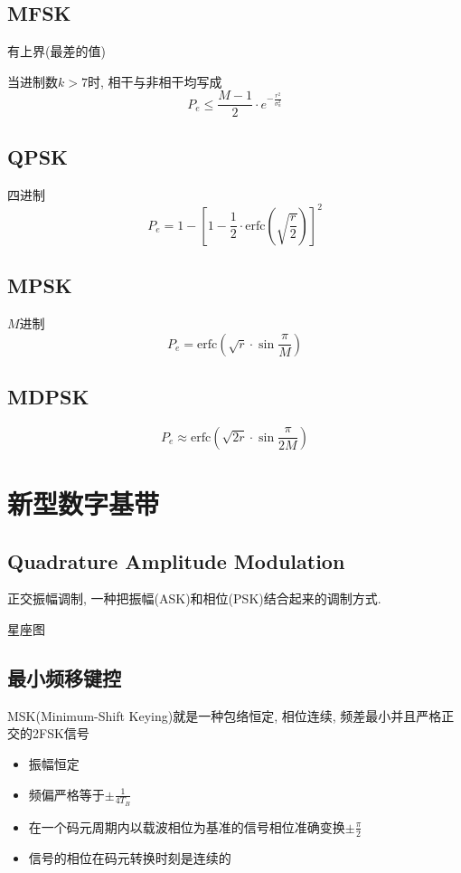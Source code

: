 \documentclass[a4paper]{report}
\begin{document}
\subsection{MFSK}
有上界(最差的值)

当进制数$k>7$时, 相干与非相干均写成
\begin{equation}
  P_e\leq \frac{M-1}{2}\cdot e^{-\frac{r^2}{\sigma_n^2}}
\end{equation}
\subsection{QPSK}
四进制
\begin{equation}
  P_e=1-[1-\frac{1}{2}\cdot \text{erfc}(\sqrt{\frac{r}{2}})]^2
\end{equation}
\subsection{MPSK}
$M$进制
\begin{equation}
  P_e=\text{erfc}(\sqrt{r}\cdot\sin{\frac{\pi}{M}})
\end{equation}
\subsection{MDPSK}
\begin{equation}
  P_e\approx \text{erfc}(\sqrt{2 r}\cdot \sin{\frac{\pi}{2M}})
\end{equation}

\section{新型数字基带}
\subsection{Quadrature Amplitude Modulation}
正交振幅调制, 一种把振幅(ASK)和相位(PSK)结合起来的调制方式. 

星座图
\subsection{最小频移键控}
MSK(Minimum-Shift Keying)就是一种包络恒定, 相位连续, 频差最小并且严格正交的2FSK信号
\begin{itemize}
  \item 振幅恒定
  \item 频偏严格等于$\pm\frac{1}{4T_B}$
  \item 在一个码元周期内以载波相位为基准的信号相位准确变换$\pm\frac{\pi}{2}$
  \item 信号的相位在码元转换时刻是连续的
\end{itemize}
\end{document}
